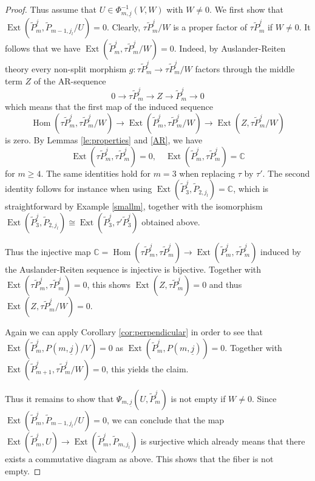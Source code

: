\documentclass{amsart}
\numberwithin{equation}{section}
\newcommand{\uj}{{\underline j}}
\newcommand{\CC}{\mathbb{C}}
\newcommand{\kk}{\Bbbk}
\newcommand{\Ext}{\operatorname{Ext}}
\newcommand{\Hom}{\operatorname{Hom}}
\newcommand{\ses}[3]{0\rightarrow #1\rightarrow #2\rightarrow#3\rightarrow 0}
\begin{document}
\begin{proof}
Thus assume that $U\in\Phi_{m,\uj}^{-1}(V,W)$ with $W\neq 0$. We first show that $\Ext(\tilde P_{m}^{\uj},\tilde P_{m-1,j_l}/U)= 0$. Clearly, $\tau\tilde P_{m}^{\uj}/W$ is a proper factor of $\tau \tilde P_{m}^{\uj}$ if $W\neq 0$. 
It follows that we have $\Ext(\tilde P_{m}^{\uj},\tau\tilde P_{m}^{\uj}/W)=0$. Indeed, by Auslander-Reiten theory every non-split morphism $g:\tau\tilde P_{m}^{\uj}\to \tau\tilde P_{m}^{\uj}/W$ factors through the middle term $Z$ of the AR-sequence 
\[\ses{\tau\tilde P_{m}^{\uj}}{Z}{\tilde P_{m}^{\uj}}\]
which means that the first map of the induced sequence
\[\Hom(\tau\tilde P_{m}^{\uj},\tau\tilde P_{m}^{\uj}/W)\to\Ext(\tilde P_{m}^{\uj},\tau\tilde P_{m}^{\uj}/W)\to\Ext(Z,\tau\tilde P_{m}^{\uj}/W) \]
is zero. By Lemmas \ref{le:properties} and \ref{AR}, we have 
$$\Ext(\tau\tilde P_m^{\uj},\tau\tilde P_m^{\uj})=0,\quad \Ext(\tilde P_m^{\uj},\tau\tilde P_m^{\uj})=\CC$$
for $m\geq 4$. The same identities hold for $m=3$ when replacing $\tau$ by $\tau'$. The second identity follows for instance when using $\Ext(\tilde P_{3}^{\uj},\tilde P_{2,j_l})=\CC$, which is straightforward by Example \ref{smallm}, together with the isomorphism $\Ext(\tilde P_{3}^{\uj},\tilde P_{2,j_l})\cong\Ext(\tilde P_{3}^{\uj},\tau'\tilde P_{3}^{\uj})$ obtained above.

Thus the injective map $\CC=\Hom(\tau \tilde P_{m}^{\uj},\tau \tilde P_{m}^{\uj})\to\Ext(\tilde P_{m}^{\uj},\tau \tilde P_{m}^{\uj})$ induced by the Auslander-Reiten sequence is injective is bijective. Together with $\Ext(\tau \tilde P_{m}^{\uj},\tau \tilde P_{m}^{\uj})=0$, this shows $\Ext(Z,\tau\tilde P_{m}^{\uj})=0$ and thus $\Ext(Z,\tau\tilde P_{m}^{\uj}/W)=0$.



Again we can apply Corollary \ref{cor:perpendicular} in order to see that $\Ext(\tilde P_{m}^{\uj},P(m,\uj)/V)=0$ as $\Ext(\tilde P_{m}^{\uj},P(m,\uj))=0$. 
 Together with $\Ext(\tilde P_{m+1}^{\uj},\tau\tilde P_{m}^{\uj}/W)=0$, this yields the claim.

Thus it remains to show that $\Psi_{m,\uj}(U,\tilde P_{m}^{\uj})$ is not empty if $W\neq 0$. Since $\Ext(\tilde P_{m}^{\uj},\tilde P_{m-1,j_l}/U)= 0$, we can conclude that the map $\Ext(\tilde P_{m}^{\uj},U)\to\Ext(\tilde P_{m}^{\uj},\tilde P_{m,j_l})$ is surjective which already means that there exists a commutative diagram as above. This shows that the fiber is not empty.
\end{proof}
\end{document}
